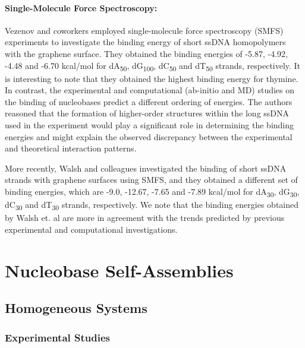 \paragraph{Single-Molecule Force Spectroscopy:} Vezenov and coworkers employed single-molecule force spectroscopy (SMFS) experiments to investigate the binding energy of short ssDNA homopolymers with the graphene surface.\supercite{manohar_peeling_2008,iliafar_quantifying_2012} They obtained the binding energies of -5.87, -4.92, -4.48 and -6.70 kcal/mol for dA\textsubscript{50}, dG\textsubscript{100}, dC\textsubscript{50} and dT\textsubscript{50} strands, respectively. It is interesting to note that they obtained the highest binding energy for thymine.  In contrast, the experimental and computational (ab-initio and MD) studies on the binding of nucleobases predict a different ordering of energies. The authors reasoned that the formation of higher-order structures within the long ssDNA used in the experiment would play a significant role in determining the binding energies and might explain the observed discrepancy between the experimental and theoretical interaction patterns.

More recently, Walsh and colleagues investigated the binding of short ssDNA strands with graphene surfaces using SMFS, and they obtained a different set of binding energies, which are -9.0, -12.67, -7.65 and -7.89 kcal/mol for dA\textsubscript{30}, dG\textsubscript{30}, dC\textsubscript{30} and dT\textsubscript{30} strands, respectively\supercite{hughes_adsorption_2017}. We note that the binding energies obtained by Walsh et. al are more in agreement with the trends predicted by previous experimental and computational investigations.

\section{Nucleobase Self-Assemblies}
\subsection{Homogeneous Systems}
\subsubsection{Experimental Studies}
